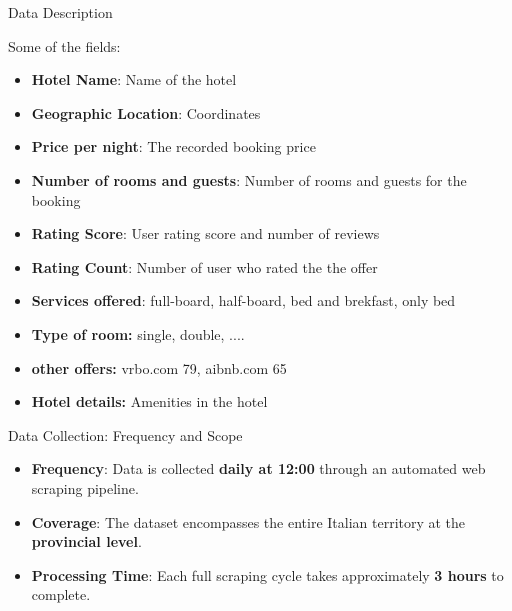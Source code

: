 \documentclass{beamer}
\begin{document}
\begin{frame}{Data Description}

Some of the fields:

\begin{itemize}
    \item  {  \footnotesize \textbf{Hotel Name}: Name of the hotel %
    }
    \item  {  \footnotesize \textbf{Geographic Location}: Coordinates }
    \item  {  \footnotesize \textbf{Price per night}: The recorded booking price %
    }
    \item {  \footnotesize  \textbf{Number of rooms and guests}: Number of rooms and guests for the booking %
    }
    \item  {  \footnotesize \textbf{Rating Score}: User rating score and number of reviews %
    }
    \item {  \footnotesize \textbf{Rating Count}: Number of user who rated the the offer}
    \item {  \footnotesize \textbf{Services offered}: full-board, half-board, bed and brekfast, only bed }
    \item {  \footnotesize \textbf{Type of room: } single, double, ....}

    \item { \footnotesize \textbf{other offers: } vrbo.com 79, aibnb.com 65}

    \item {\footnotesize \textbf{Hotel details: } Amenities in the hotel}
    
\end{itemize}

\end{frame}

\begin{frame}{Data Collection: Frequency and Scope}
\begin{itemize}
    \item \textbf{Frequency}: Data is collected \textbf{daily at 12:00} through an automated web scraping pipeline.  
    \item \textbf{Coverage}: The dataset encompasses the entire Italian territory at the \textbf{provincial level}.  
    \item \textbf{Processing Time}: Each full scraping cycle takes approximately \textbf{3 hours} to complete.  

\end{itemize}
\end{frame}
\end{document}
